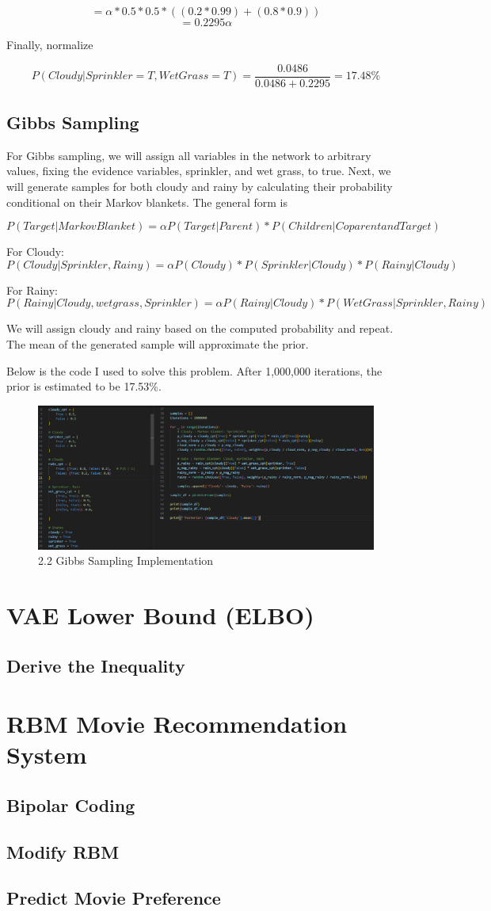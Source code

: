 \documentclass{article}
\begin{document}
\[ = \alpha * 0.5 * 0.5 * ((0.2 * 0.99) + (0.8 * 0.9))\]
\[ = 0.2295\alpha\]

Finally, normalize

\[P(Cloudy | Sprinkler = T, WetGrass = T) = \frac{0.0486}{0.0486 + 0.2295} = 17.48 \%\]

\subsection{Gibbs Sampling}
For Gibbs sampling, we will assign all variables in the network to arbitrary values, fixing the evidence variables, sprinkler, and wet grass, to true. Next, we will generate samples for both cloudy and rainy by calculating their probability conditional on their Markov blankets. The general form is

\[ P(Target | Markov Blanket) = \alpha P(Target | Parent) * P(Children | Coparent and Target)\]

For Cloudy:
\[ P(Cloudy | Sprinkler, Rainy) = \alpha P( Cloudy) * P(Sprinkler | Cloudy) * P(Rainy | Cloudy)\]

For Rainy:
\[ P(Rainy | Cloudy, wetgrass, Sprinkler) = \alpha P(Rainy | Cloudy) * P(WetGrass | Sprinkler, Rainy)\]

We will assign cloudy and rainy based on the computed probability and repeat. The mean of the generated sample will approximate the prior.

Below is the code I used to solve this problem. After 1,000,000 iterations, the prior is estimated to be 17.53\%.

\begin{figure}[H]
    \centering
    \includegraphics[width=1\linewidth]{Q2 Code.png}
    \caption{2.2 Gibbs Sampling Implementation}
    \label{fig:enter-label}
\end{figure}

\section{VAE Lower Bound (ELBO)}
\subsection{Derive the Inequality}

\section{RBM Movie Recommendation System}
\subsection{Bipolar Coding}
\subsection{Modify RBM}
\subsection{Predict Movie Preference}
\end{document}
